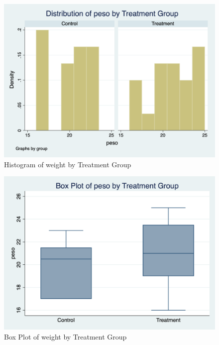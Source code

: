 \documentclass{article}
\begin{document}
\begin{figure}[h]
\centering
\includegraphics[scale=0.30]{histogram_peso_trad.png}
\caption{Histogram of weight by Treatment Group}
\end{figure}

\begin{figure}[h]
\centering
\includegraphics[scale=0.30]{box_plot_peso_trad.png}
\caption{Box Plot of weight by Treatment Group}
\end{figure}
\end{document}
